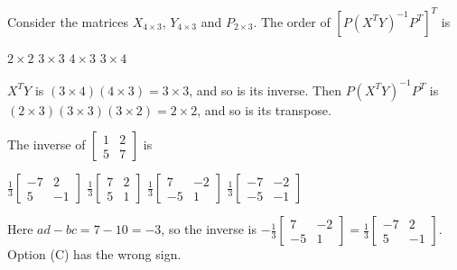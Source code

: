\begin{question}[id=gate-ce2005-1, source=GATE CE 2005]
Consider the matrices $X_{4 \times 3}$, $Y_{4 \times 3}$ and $P_{2 \times 3}$. The order of $\left[P(X^TY)^{-1}P^T\right]^T$ is
\begin{options}
  \correct $2 \times 2$
  \option $3 \times 3$
  \option $4 \times 3$
  \option $3 \times 4$
\end{options}
\begin{solution}
$X^TY$ is $(3 \times 4)(4 \times 3) = 3 \times 3$, and so is its inverse. Then $P(X^TY)^{-1}P^T$ is $(2 \times 3)(3 \times 3)(3 \times 2) = 2 \times 2$, and so is its transpose.
\end{solution}
\end{question}

\begin{question}[id=gate-ce2007-1, source=GATE CE 2007]
The inverse of $\begin{bmatrix} 1 & 2 \\ 5 & 7 \end{bmatrix}$ is
\begin{options}
  \correct $\frac{1}{3}\begin{bmatrix} -7 & 2 \\ 5 & -1 \end{bmatrix}$
  \option $\frac{1}{3}\begin{bmatrix} 7 & 2 \\ 5 & 1 \end{bmatrix}$
  \option $\frac{1}{3}\begin{bmatrix} 7 & -2 \\ -5 & 1 \end{bmatrix}$
  \option $\frac{1}{3}\begin{bmatrix} -7 & -2 \\ -5 & -1 \end{bmatrix}$
\end{options}
\begin{solution}
Here $ad - bc = 7 - 10 = -3$, so the inverse is $-\frac{1}{3}\begin{bmatrix} 7 & -2 \\ -5 & 1 \end{bmatrix} = \frac{1}{3}\begin{bmatrix} -7 & 2 \\ 5 & -1 \end{bmatrix}$. Option (C) has the wrong sign.
\end{solution}
\end{question}

